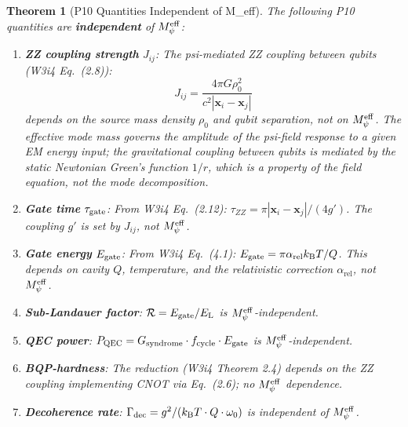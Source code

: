 \documentclass[11pt]{article}
\newtheorem{theorem}{Theorem}[section]
\theoremstyle{definition}
\theoremstyle{remark}
\newcommand{\kB}{k_{\mathrm{B}}}
\newcommand{\EL}{E_{\mathrm{L}}}
\newcommand{\arel}{\alpha_{\mathrm{rel}}}
\newcommand{\Meff}{M_\psi^{\rm eff}}
\begin{document}
\begin{theorem}[P10 Quantities Independent of M\_eff]
\label{thm:p10_meff_independent}
The following P10 quantities are \textbf{independent} of $\Meff$:

\begin{enumerate}[label=(\roman*)]
\item \textbf{ZZ coupling strength} $J_{ij}$: The psi-mediated ZZ coupling
  between qubits (W3i4 Eq.~(2.8)):
  \begin{equation}
  J_{ij} = \frac{4\pi G\rho_0^2}{c^2 |\mathbf{x}_i - \mathbf{x}_j|}
  \end{equation}
  depends on the source mass density $\rho_0$ and qubit separation, not
  on $\Meff$. The effective mode mass governs the \emph{amplitude} of the
  psi-field response to a given EM energy input; the gravitational
  coupling between qubits is mediated by the static Newtonian Green's
  function $1/r$, which is a property of the field equation, not the
  mode decomposition.

\item \textbf{Gate time} $\tau_{\rm gate}$: From W3i4 Eq.~(2.12):
  $\tau_{ZZ} = \pi|\mathbf{x}_i - \mathbf{x}_j|/(4g')$. The coupling
  $g'$ is set by $J_{ij}$, not $\Meff$.

\item \textbf{Gate energy} $E_{\rm gate}$: From W3i4 Eq.~(4.1):
  $E_{\rm gate} = \pi\arel\kB T/Q$. This depends on cavity $Q$,
  temperature, and the relativistic correction $\arel$, not $\Meff$.

\item \textbf{Sub-Landauer factor}: $\mathcal{R} = E_{\rm gate}/\EL$
  is $\Meff$-independent.

\item \textbf{QEC power}: $P_{\rm QEC} = G_{\rm syndrome}\cdot
  f_{\rm cycle}\cdot E_{\rm gate}$ is $\Meff$-independent.

\item \textbf{BQP-hardness}: The reduction (W3i4 Theorem 2.4) depends
  on the ZZ coupling implementing CNOT via Eq.~(2.6); no $\Meff$
  dependence.

\item \textbf{Decoherence rate}: $\Gamma_{\rm dec} = g^2/(\kB T\cdot Q
  \cdot\omega_0)$ is independent of $\Meff$.
\end{enumerate}
\end{theorem}
\end{document}
